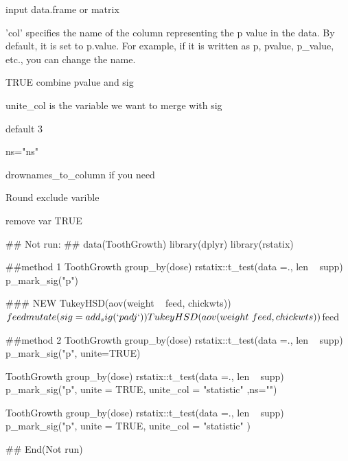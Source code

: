 \documentclass[a4paper]{book}
\begin{document}
\begin{Arguments}
\begin{ldescription}
\item[\code{data}] input data.frame or matrix

\item[\code{col}] 'col' specifies the name of the column representing the p value in the data. By default, it is set to p.value. For example, if it is written as p, pvalue, p\_value, etc., you can change the name.

\item[\code{unite}] TRUE combine pvalue and sig

\item[\code{unite\_col}] unite\_col is the variable we want to merge with sig

\item[\code{digits}] default 3

\item[\code{ns}] ns="ns"

\item[\code{rownames\_to\_column}] drownames\_to\_column if you need

\item[\code{exclude}] Round exclude varible

\item[\code{remove}] remove var TRUE
\end{ldescription}
\end{Arguments}
%
\begin{Examples}
\begin{ExampleCode}

\#\# Not run: 
## data(ToothGrowth)
library(dplyr)
library(rstatix)

##method 1
 ToothGrowth %
  group_by(dose) %
  rstatix::t_test(data =., len ~ supp) %
  p_mark_sig("p")

  ### NEW
  TukeyHSD(aov(weight ~ feed, chickwts))$feed %
  mutate(sig = add_sig(`p adj`))

  TukeyHSD(aov(weight ~ feed, chickwts))$feed %


##method 2
 ToothGrowth %
 group_by(dose) %
 rstatix::t_test(data =., len ~ supp) %
  p_mark_sig("p", unite=TRUE)


 ToothGrowth %
     group_by(dose) %
    rstatix::t_test(data =., len ~ supp) %
    p_mark_sig("p", unite = TRUE, unite_col = "statistic" ,ns="")

 ToothGrowth %
   group_by(dose) %
   rstatix::t_test(data =., len ~ supp) %
   p_mark_sig("p", unite = TRUE, unite_col = "statistic" )

## End(Not run)


\end{ExampleCode}
\end{Examples}
\end{document}
